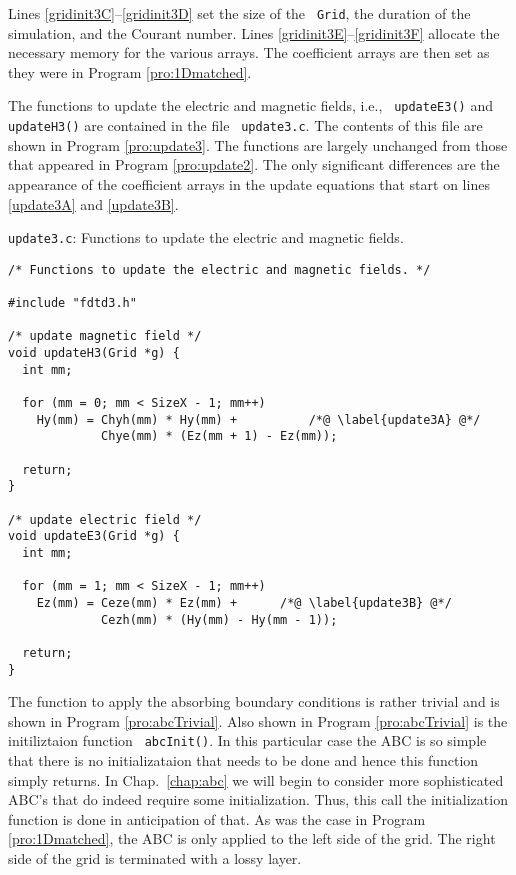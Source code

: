 Lines \ref{gridinit3C}--\ref{gridinit3D} set the size of the {\tt
  Grid}, the duration of the simulation, and the Courant number.
Lines \ref{gridinit3E}--\ref{gridinit3F} allocate the necessary memory
for the various arrays.  The coefficient arrays are then set as they
were in Program \ref{pro:1Dmatched}.

The functions to update the electric and magnetic fields, i.e., {\tt
  updateE3()} and {\tt updateH3()} are contained in the file {\tt
  update3.c}.  The contents of this file are shown in Program
\ref{pro:update3}.  The functions are largely unchanged from those
that appeared in Program \ref{pro:update2}.  The only significant
differences are the appearance of the coefficient arrays in the update
equations that start on lines \ref{update3A} and \ref{update3B}.
\begin{program}
{\tt update3.c}: Functions to update the electric and magnetic fields.
\label{pro:update3}
\codemiddle
\begin{lstlisting}
/* Functions to update the electric and magnetic fields. */

#include "fdtd3.h"

/* update magnetic field */
void updateH3(Grid *g) {
  int mm;

  for (mm = 0; mm < SizeX - 1; mm++)
    Hy(mm) = Chyh(mm) * Hy(mm) +          /*@ \label{update3A} @*/
             Chye(mm) * (Ez(mm + 1) - Ez(mm));

  return;
}

/* update electric field */
void updateE3(Grid *g) {
  int mm;

  for (mm = 1; mm < SizeX - 1; mm++)
    Ez(mm) = Ceze(mm) * Ez(mm) +      /*@ \label{update3B} @*/
             Cezh(mm) * (Hy(mm) - Hy(mm - 1));

  return;
}
\end{lstlisting}
\end{program}

The function to apply the absorbing boundary conditions is rather
trivial and is shown in Program \ref{pro:abcTrivial}.  Also shown in
Program \ref{pro:abcTrivial} is the initiliztaion function {\tt
  abcInit()}.  In this particular case the ABC is so simple that there
is no initializataion that needs to be done and hence this function
simply returns.  In Chap.\ \ref{chap:abc} we will begin to consider more
sophisticated ABC's that do indeed require some initialization.  Thus,
this call the initialization function is done in anticipation of that.
As was the case in Program \ref{pro:1Dmatched}, the ABC is only
applied to the left side of the grid.  The right side of the grid is
terminated with a lossy layer.


